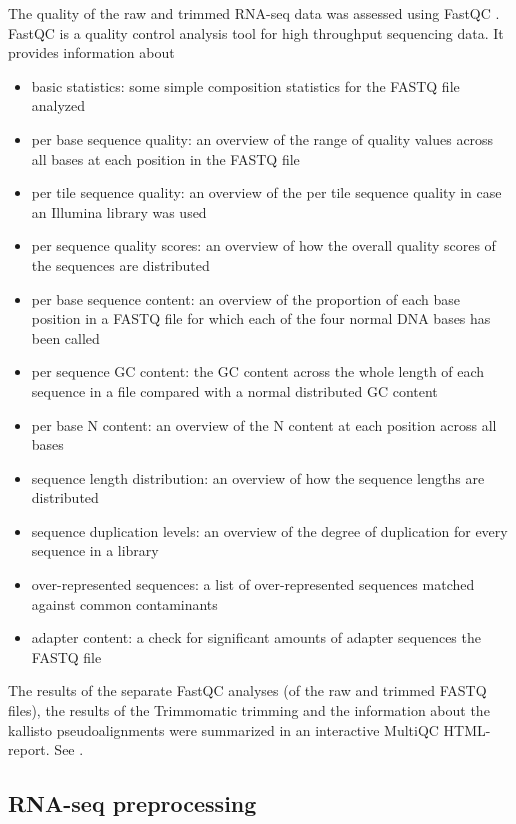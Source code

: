 The quality of the raw and trimmed RNA-seq data was assessed using FastQC \autocite{babraham}. FastQC is a quality control analysis tool for high throughput sequencing data. It provides information about
\begin{itemize}
    \item basic statistics: some simple composition statistics for the FASTQ file analyzed
    \item per base sequence quality: an overview of the range of quality values across all bases at each position in the FASTQ file
    \item per tile sequence quality: an overview of the per tile sequence quality in case an Illumina library was used
    \item per sequence quality scores: an overview of how the overall quality scores of the sequences are distributed
    \item per base sequence content: an overview of the proportion of each base position in a FASTQ file for which each of the four normal DNA bases has been called
    \item per sequence GC content: the GC content across the whole length of each sequence in a file compared with a normal distributed GC content
    \item per base N content: an overview of the N content at each position across all bases
    \item sequence length distribution: an overview of how the sequence lengths are distributed
    \item sequence duplication levels: an overview of the degree of duplication for every sequence in a library
    \item over-represented sequences: a list of over-represented sequences matched against common contaminants
    \item adapter content: a check for significant amounts of adapter sequences the FASTQ file
\end{itemize}

The results of the separate FastQC analyses (of the raw and trimmed FASTQ files), the results of the Trimmomatic trimming and the information about the kallisto pseudoalignments were summarized in an interactive MultiQC HTML-report. See \autocite{10.1093/bioinformatics/btw354}.


\subsection{RNA-seq preprocessing}\label{RNA-seq-preprocessing}

